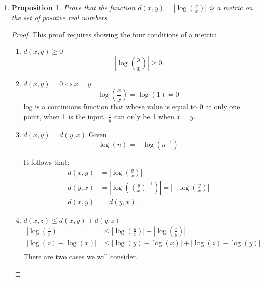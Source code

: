 \documentclass[12pt,a4paper,reqno,parskip=full]{amsart}
\numberwithin{equation}{section}
\theoremstyle{plain}
\newtheorem{proposition}[subsection]{Proposition}
\theoremstyle{definition}
\renewcommand{\leq}{\leqslant}
\renewcommand{\geq}{\geqslant}
\begin{document}
\begin{enumerate}
\begin{proof}
          In all of the cases, and only the cases, where $x \notin A\cap B$ and $x \in S$, is
          $2x^2-5x$ either positive and even or negative and odd.
        \end{proof}

  \item
        \begin{proposition}
          Prove that the function $d(x,y) = \left|\log\left(\frac{y}{x}\right)\right|$
          is a metric on the set of positive real numbers.
        \end{proposition}
        \begin{proof} This proof requires showing the four conditions of a metric:
          \begin{enumerate}
            \item $d(x,y) \geq 0$
                  \[
                    \left|\log\left(\frac{y}{x}\right)\right| \geq 0
                  \]
            \item $d(x,y) = 0 \iff x = y$
                  \[
                    \log\left(\frac{x}{x}\right) = \log(1) = 0
                  \]
                  log is a continuous function that whose value is equal to 0 at only one point, when 1 is the input. $\frac{x}{y}$ can only be 1 when $x = y$.
            \item $d(x,y) = d(y,x)$
                  Given
                  \[\log(n) = -\log(n^{-1})\]

                  It follows that:
                  \begin{align*}
                    d(x,y) & = \left|\log\left(\frac{y}{x}\right)\right|                                                     \\
                    d(y,x) & = \left|\log\left((\frac{y}{x})^{-1}\right)\right| = \left|-\log\left(\frac{y}{x}\right)\right| \\
                    d(x,y) & = d(y,x).
                  \end{align*}
            \item $d(x,z) \leq d(x,y) + d(y,z)$
                  \begin{align*}
                    \left|\log\left(\frac{z}{x}\right)\right| & \leq \left|\log\left(\frac{y}{x}\right)\right| + \left|\log\left(\frac{z}{y}\right)\right| \\
                    |\log(z) - \log(x)|                       & \leq |\log(y) - \log(x)| + |\log(z) - \log(y)|                                             \\
                  \end{align*}
                  There are two cases we will consider.


\end{enumerate}
\end{proof}
\end{enumerate}
\end{document}
